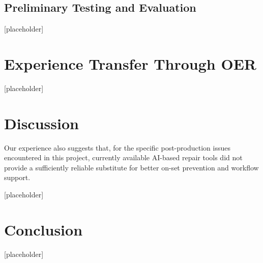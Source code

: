 \documentclass[conference]{IEEEtran}
\begin{document}
\subsection{Preliminary Testing and Evaluation}
[placeholder]

\section{Experience Transfer Through OER}
[placeholder]


\section{Discussion}
Our experience also suggests that, for the specific post-production issues encountered in this project, currently available AI-based repair tools did not provide a sufficiently reliable substitute for better on-set prevention and workflow support.

[placeholder]

\section{Conclusion}
[placeholder]





















\vspace{12pt}
\end{document}
